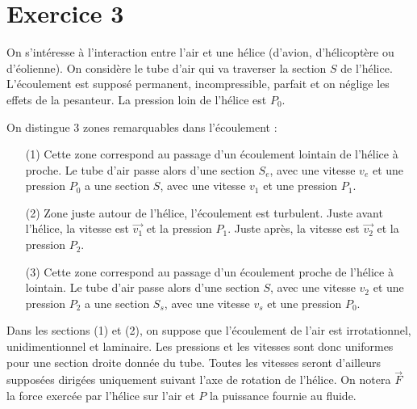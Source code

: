 \documentclass{report}
\begin{document}
\newpage

\section*{Exercice 3}

On s'intéresse à l'interaction entre l'air et une hélice (d'avion, d'hélicoptère ou d'éolienne). On considère le tube d'air qui va traverser la section $S$ de l'hélice. L'écoulement est supposé permanent, incompressible, parfait et on néglige les effets de la pesanteur. La pression loin de l'hélice est $P_0$. 

On distingue 3 zones remarquables dans l'écoulement :
\begin{itemize}
	\item[(1) ] Cette zone correspond au passage d'un écoulement lointain de l'hélice à proche. Le tube d'air passe alors d'une section $S_e$, avec une vitesse $v_e$ et une pression $P_0$ a une section $S$, avec une vitesse $v_1$ et une pression $P_1$.
	\item[(2) ] Zone juste autour de l'hélice, l'écoulement est turbulent. Juste avant l'hélice, la vitesse est $\vec{v_1}$ et la pression $P_1$. Juste après, la vitesse est $\vec{v_2}$ et la pression $P_2$.
	\item[(3) ] Cette zone correspond au passage d'un écoulement proche de l'hélice à lointain. Le tube d'air passe alors d'une section $S$, avec une vitesse $v_2$ et une pression $P_2$ a une section $S_s$, avec une vitesse $v_s$ et une pression $P_0$.
\end{itemize}
Dans les sections (1) et (2), on suppose que l'écoulement de l'air est irrotationnel, unidimentionnel et laminaire. Les pressions et les vitesses sont donc uniformes pour une section droite donnée du tube. Toutes les vitesses seront d'ailleurs supposées dirigées uniquement suivant l'axe de rotation de l'hélice. 
On notera $\vec{F}$ la force exercée par l'hélice sur l'air et $P$ la puissance fournie au fluide.
\end{document}
